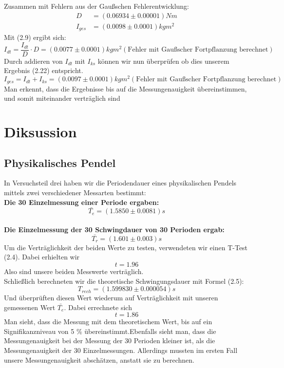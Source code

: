 \documentclass[11pt,a4paper]{article}
\begin{document}
	Zusammen mit Fehlern aus der Gaußschen Fehlerentwicklung:
	\begin{align}
	D&=(0.06934 \pm 0.00001) Nm \\
	I_{ges}&=(0.0098 \pm 0.0001)kgm^2
	\end{align}
	Mit (2.9) ergibt sich:
	\begin{equation}
	I_{dt}=\frac{I_{dt}}{D} \cdot D =(0.0077 \pm 0.0001)kgm^2 (\text{Fehler mit Gaußscher Fortpflanzung berechnet})
	\end{equation}
	\vspace{0.5 ex}Durch addieren von $I_{dt}$ mit $I_{ks}$ können wir nun überprüfen ob dies unserem Ergebnis (2.22)
	entspricht.
	\begin{equation}
	I_{ges}=I_{dt}+I_{ks}=(0.0097 \pm 0.0001)kgm^2 (\text{Fehler mit Gaußscher Fortpflanzung berechnet})
	\end{equation}
	Man erkennt, dass die Ergebnisse bis auf die Messungenauigkeit übereinstimmen, und somit miteinander verträglich sind
\newpage

\section{Diksussion}

	\subsection{Physikalisches Pendel}
	In Versuchsteil drei haben wir die Periodendauer eines physikalischen Pendels mittels
	zwei verschiedener Messarten bestimmt:\\
	{\bf Die 30 Einzelmessung einer Periode ergaben:}$$\bar{T_e}=(1.5850 \pm 0.0081)s$$\\
	{\bf Die Einzelmessung der 30 Schwingdauer von 30 Perioden ergab:} $$\bar{T_r}=(1.601\pm 0.003)s$$
	Um die Verträglichkeit der beiden Werte zu testen, verwendeten wir einen T-Test (2.4). Dabei erhielten wir $$t=1.96$$ Also sind unsere beiden Messwerte verträglich.
	\\ Schließlich berechneten wir die theoretische Schwingungsdauer mit Formel (2.5):
	$$T_{rech}=(1.599830\pm 0.000054)s$$
	Und überprüften diesen Wert wiederum auf Verträglichkeit mit unseren gemessenen Wert $\bar{T_e}$.
	Dabei errechnete sich
	$$t=1.86$$
	Man sieht, dass die Messung mit dem theoretischem Wert, bis auf ein Signifikanzniveau von 5 \% übereinstimmt.Ebenfalls sieht man, dass die Messungenauigkeit bei der Messung der 30 Perioden kleiner ist, als die Messungenauigkeit der 30 Einzelmessungen. Allerdings mussten im ersten Fall unsere Messungenauigkeit abschätzen, anstatt sie zu berechnen.
\end{document}
